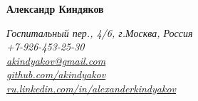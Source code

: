 \documentclass[a4paper, 11pt]{article}
\begin{document}
{\LARGE\textbf{Александр Киндяков}}


\begin{flushright}
    {\itshape
        Госпитальный пер., 4/6, г.Москва, Россия \\
        +7-926-453-25-30 \\
        \href{mailto:akindyakov@gmail.com}{akindyakov@gmail.com} \\
        \href{https://github.com/akindyakov}{github.com/akindyakov} \\
        \href{http://ru.linkedin.com/in/alexanderkindyakov}{ru.linkedin.com/in/alexanderkindyakov} \\
    }
\end{flushright}
\end{document}
